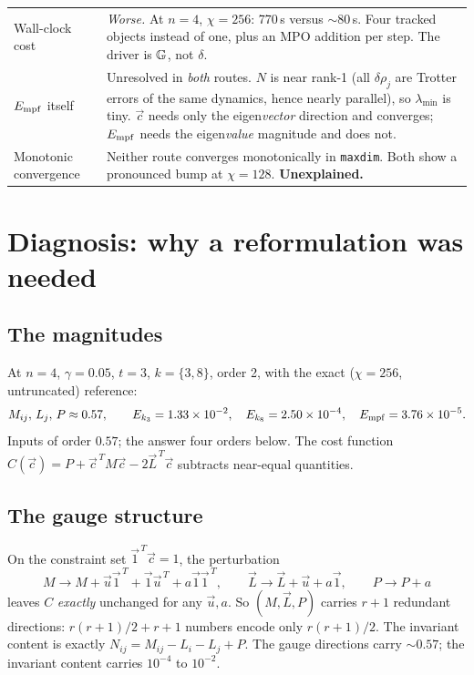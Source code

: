\documentclass[11pt,a4paper]{article}
\begin{document}
\begin{longtable}{@{}p{}p{}@{}}
Wall-clock cost &
\emph{Worse.} At $n=4$, $\chi=256$: 770\,s versus ${\sim}80$\,s. Four tracked objects
instead of one, plus an MPO addition per step. The driver is $\mathbb{G}$, not $\delta$.\\[2pt]
$E_{\rm mpf}$ itself &
Unresolved in \emph{both} routes. $N$ is near rank-1 (all $\delta\rho_j$ are Trotter
errors of the same dynamics, hence nearly parallel), so $\lambda_{\min}$ is tiny.
$\vec c$ needs only the eigen\emph{vector} direction and converges; $E_{\rm mpf}$ needs
the eigen\emph{value} magnitude and does not.\\[2pt]
Monotonic convergence &
Neither route converges monotonically in \texttt{maxdim}. Both show a pronounced bump at
$\chi=128$. \textbf{Unexplained.}\\
\bottomrule
\end{longtable}

\section{Diagnosis: why a reformulation was needed}

\subsection{The magnitudes}
At $n=4$, $\gamma=0.05$, $t=3$, $k=\{3,8\}$, order 2, with the exact ($\chi=256$, untruncated)
reference:
\[
M_{ij},\,L_j,\,P \approx 0.57,\qquad
E_{k_3}=1.33\times10^{-2},\quad E_{k_8}=2.50\times10^{-4},\quad E_{\rm mpf}=3.76\times10^{-5}.
\]
Inputs of order $0.57$; the answer four orders below. The cost function
$C(\vec c)=P+\vec c^{\,T}M\vec c-2\vec L^{\,T}\vec c$ subtracts near-equal quantities.

\subsection{The gauge structure}
On the constraint set $\vec 1^{\,T}\vec c=1$, the perturbation
\[
M\to M+\vec u\vec 1^{\,T}+\vec 1\vec u^{\,T}+a\vec1\vec1^{\,T},\qquad
\vec L\to\vec L+\vec u+a\vec1,\qquad P\to P+a
\]
leaves $C$ \emph{exactly} unchanged for any $\vec u,a$. So $(M,\vec L,P)$ carries $r+1$
redundant directions: $r(r+1)/2+r+1$ numbers encode only $r(r+1)/2$. The invariant content is
exactly $N_{ij}=M_{ij}-L_i-L_j+P$. The gauge directions carry ${\sim}0.57$; the invariant
content carries $10^{-4}$ to $10^{-2}$.
\end{document}
